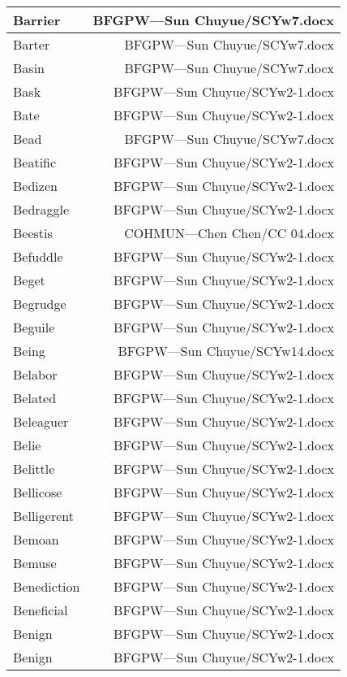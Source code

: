 \documentclass{article}
\begin{document}
\begin{center}
\begin{longtable}{|l|r|}
\hline
Barrier  &  BFGPW---Sun Chuyue/SCYw7.docx\\  
\hline
Barter  &  BFGPW---Sun Chuyue/SCYw7.docx\\  
\hline
Basin  &  BFGPW---Sun Chuyue/SCYw7.docx\\  
\hline
Bask  &  BFGPW---Sun Chuyue/SCYw2-1.docx\\  
\hline
Bate  &  BFGPW---Sun Chuyue/SCYw2-1.docx\\  
\hline
Bead  &  BFGPW---Sun Chuyue/SCYw7.docx\\  
\hline
Beatific  &  BFGPW---Sun Chuyue/SCYw2-1.docx\\  
\hline
Bedizen  &  BFGPW---Sun Chuyue/SCYw2-1.docx\\  
\hline
Bedraggle  &  BFGPW---Sun Chuyue/SCYw2-1.docx\\  
\hline
Beestis  &  COHMUN---Chen Chen/CC 04.docx\\  
\hline
Befuddle  &  BFGPW---Sun Chuyue/SCYw2-1.docx\\  
\hline
Beget  &  BFGPW---Sun Chuyue/SCYw2-1.docx\\  
\hline
Begrudge  &  BFGPW---Sun Chuyue/SCYw2-1.docx\\  
\hline
Beguile  &  BFGPW---Sun Chuyue/SCYw2-1.docx\\  
\hline
Being  &  BFGPW---Sun Chuyue/SCYw14.docx\\  
\hline
Belabor  &  BFGPW---Sun Chuyue/SCYw2-1.docx\\  
\hline
Belated  &  BFGPW---Sun Chuyue/SCYw2-1.docx\\  
\hline
Beleaguer  &  BFGPW---Sun Chuyue/SCYw2-1.docx\\  
\hline
Belie  &  BFGPW---Sun Chuyue/SCYw2-1.docx\\  
\hline
Belittle  &  BFGPW---Sun Chuyue/SCYw2-1.docx\\  
\hline
Bellicose  &  BFGPW---Sun Chuyue/SCYw2-1.docx\\  
\hline
Belligerent  &  BFGPW---Sun Chuyue/SCYw2-1.docx\\  
\hline
Bemoan  &  BFGPW---Sun Chuyue/SCYw2-1.docx\\  
\hline
Bemuse  &  BFGPW---Sun Chuyue/SCYw2-1.docx\\  
\hline
Benediction  &  BFGPW---Sun Chuyue/SCYw2-1.docx\\  
\hline
Beneficial  &  BFGPW---Sun Chuyue/SCYw2-1.docx\\  
\hline
Benign  &  BFGPW---Sun Chuyue/SCYw2-1.docx\\  
\hline
Benign  &  BFGPW---Sun Chuyue/SCYw2-1.docx\\  

\end{longtable}
\end{center}
\end{document}
